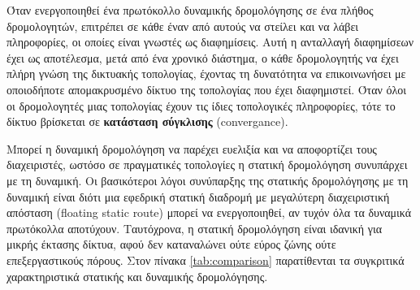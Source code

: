 \documentclass{EdipyLabs} %
\begin{document}
Όταν ενεργοποιηθεί ένα πρωτόκολλο δυναμικής δρομολόγησης σε ένα πλήθος δρομολογητών, επιτρέπει σε κάθε έναν από αυτούς να στείλει και να λάβει πληροφορίες, οι οποίες είναι γνωστές ως διαφημίσεις. Αυτή η ανταλλαγή διαφημίσεων έχει ως αποτέλεσμα, μετά από ένα χρονικό διάστημα, ο κάθε δρομολογητής να έχει πλήρη γνώση της δικτυακής τοπολογίας, έχοντας τη δυνατότητα να επικοινωνήσει με οποιοδήποτε απομακρυσμένο δίκτυο της τοπολογίας που έχει διαφημιστεί. Όταν όλοι οι δρομολογητές μιας τοπολογίας έχουν τις ίδιες τοπολογικές πληροφορίες, τότε το δίκτυο βρίσκεται σε \textbf{κατάσταση σύγκλισης} (convergance).

Μπορεί η δυναμική δρομολόγηση να παρέχει ευελιξία και να αποφορτίζει τους διαχειριστές, ωστόσο σε πραγματικές τοπολογίες η στατική δρομολόγηση συνυπάρχει με τη δυναμική. Οι βασικότεροι λόγοι συνύπαρξης της στατικής δρομολόγησης με τη δυναμική είναι διότι μια εφεδρική στατική διαδρομή με μεγαλύτερη διαχειριστική απόσταση (floating static route) μπορεί να ενεργοποιηθεί, αν τυχόν όλα τα δυναμικά πρωτόκολλα αποτύχουν. Ταυτόχρονα, η στατική δρομολόγηση είναι ιδανική για μικρής έκτασης δίκτυα, αφού δεν καταναλώνει ούτε εύρος ζώνης ούτε επεξεργαστικούς πόρους. Στον πίνακα \ref{tab:comparison} παρατίθενται τα συγκριτικά χαρακτηριστικά στατικής και δυναμικής δρομολόγησης.

\begin{table}[ht]\renewcommand\arraystretch{1.5}
\caption{Σύγκριση χαρακτηριστικών δυναμικής και στατικής δρομολόγησης.}\label{tab:comparison}
\end{table}
\end{document}
